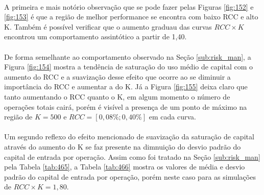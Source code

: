 \paragraph{} A primeira e mais notório observação que se pode fazer pelas Figuras \ref{fig:152} e \ref{fig:153} é que a região de melhor performance se encontra com baixo RCC e alto K. Também é possível verificar que o aumento graduau das curvas \begin{math} RCC \times K \end{math} encontrou um comportamento assintótico a partir de 1,40.

\paragraph{} De forma semelhante ao comportamento observado na Seção \ref{sub:risk_man}, a Figura \ref{fig:154} mostra a tendência de saturação do uso médio de capital com o aumento do RCC e a suavização desse efeito que ocorre ao se diminuir a importância do RCC e aumentar a do K. Já a Figura \ref{fig:155} deixa claro que tanto aumentando o RCC quanto o K, em algum momento o número de operações totais cairá, porém é visível a presença de um ponto de máximo na região de \begin{math} K=500 \end{math} e \begin{math} RCC=[0,08\%; 0,40\%] \end{math} em cada curva.


\paragraph{} Um segundo reflexo do efeito mencionado de suavização da saturação de capital através do aumento do K se faz presente na dimnuição do desvio padrão do capital de entrada por operação. Assim como foi tratado na Seção \ref{sub:risk_man} pela Tabela \ref{tab:465}, a Tabela \ref{tab:466} mostra os valores de média e desvio padrão do capital de entrada por operação, porém neste caso para as simulações de \begin{math} RCC \times K = 1,80 \end{math}.

